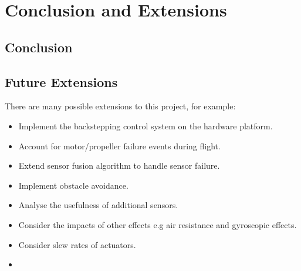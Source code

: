 
\chapter{Conclusion and Extensions}

\section{Conclusion}

\section{Future Extensions}
There are many possible extensions to this project, for example:

\begin{itemize}
\item Implement the backstepping control system on the hardware platform.\\
\item Account for motor/propeller failure events during flight.\\
\item Extend sensor fusion algorithm to handle sensor failure.\\
\item Implement obstacle avoidance.\\
\item Analyse the usefulness of additional sensors.\\
\item Consider the impacts of other effects e.g air resistance and gyroscopic effects.\\
\item Consider slew rates of actuators.\\
\item 


\end{itemize}

\clearpage


